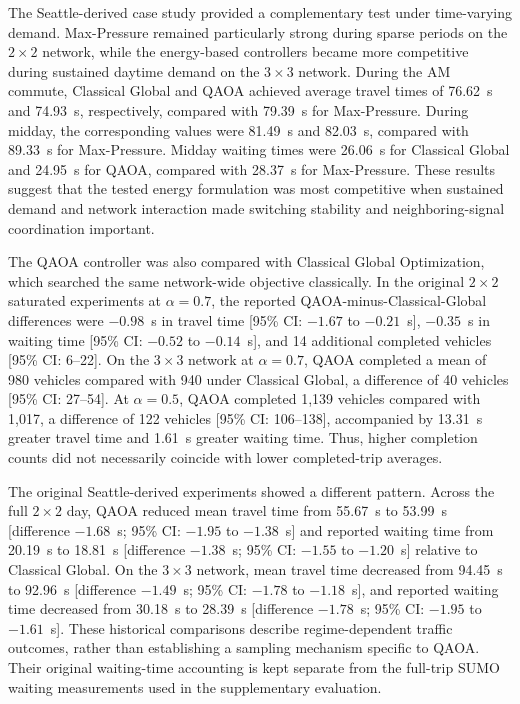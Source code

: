 The Seattle-derived case study provided a complementary test under time-varying demand. Max-Pressure remained particularly strong during sparse periods on the $2\times2$ network, while the energy-based controllers became more competitive during sustained daytime demand on the $3\times3$ network. During the AM commute, Classical Global and QAOA achieved average travel times of 76.62~s and 74.93~s, respectively, compared with 79.39~s for Max-Pressure. During midday, the corresponding values were 81.49~s and 82.03~s, compared with 89.33~s for Max-Pressure. Midday waiting times were 26.06~s for Classical Global and 24.95~s for QAOA, compared with 28.37~s for Max-Pressure. These results suggest that the tested energy formulation was most competitive when sustained demand and network interaction made switching stability and neighboring-signal coordination important.

The QAOA controller was also compared with Classical Global Optimization, which searched the same network-wide objective classically. In the original $2\times2$ saturated experiments at $\alpha=0.7$, the reported QAOA-minus-Classical-Global differences were $-0.98$~s in travel time [95\% CI: $-1.67$ to $-0.21$~s], $-0.35$~s in waiting time [95\% CI: $-0.52$ to $-0.14$~s], and 14 additional completed vehicles [95\% CI: 6--22]. On the $3\times3$ network at $\alpha=0.7$, QAOA completed a mean of 980 vehicles compared with 940 under Classical Global, a difference of 40 vehicles [95\% CI: 27--54]. At $\alpha=0.5$, QAOA completed 1,139 vehicles compared with 1,017, a difference of 122 vehicles [95\% CI: 106--138], accompanied by 13.31~s greater travel time and 1.61~s greater waiting time. Thus, higher completion counts did not necessarily coincide with lower completed-trip averages.

The original Seattle-derived experiments showed a different pattern. Across the full $2\times2$ day, QAOA reduced mean travel time from 55.67~s to 53.99~s [difference $-1.68$~s; 95\% CI: $-1.95$ to $-1.38$~s] and reported waiting time from 20.19~s to 18.81~s [difference $-1.38$~s; 95\% CI: $-1.55$ to $-1.20$~s] relative to Classical Global. On the $3\times3$ network, mean travel time decreased from 94.45~s to 92.96~s [difference $-1.49$~s; 95\% CI: $-1.78$ to $-1.18$~s], and reported waiting time decreased from 30.18~s to 28.39~s [difference $-1.78$~s; 95\% CI: $-1.95$ to $-1.61$~s]. These historical comparisons describe regime-dependent traffic outcomes, rather than establishing a sampling mechanism specific to QAOA. Their original waiting-time accounting is kept separate from the full-trip SUMO waiting measurements used in the supplementary evaluation.


